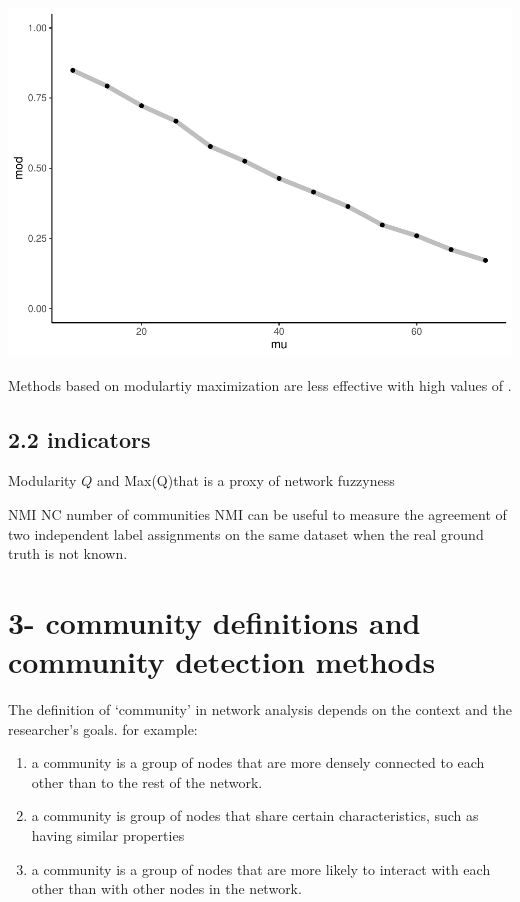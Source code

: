 \documentclass[
]{article}
\begin{document}
\includegraphics{com_det_algorithms_files/figure-latex/unnamed-chunk-2-1.pdf}

Methods based on modulartiy maximization are less effective with high
values of \mu.

\newpage

\hypertarget{indicators}{%
\subsection{2.2 indicators}\label{indicators}}

Modularity \(Q\) and Max(Q)that is a proxy of network fuzzyness

NMI NC number of communities NMI can be useful to measure the agreement
of two independent label assignments on the same dataset when the real
ground truth is not known.

\newpage

\hypertarget{community-definitions-and-community-detection-methods}{%
\section{3- community definitions and community detection
methods}\label{community-definitions-and-community-detection-methods}}

The definition of `community' in network analysis depends on the context
and the researcher's goals. for example:

\begin{enumerate}
\def\labelenumi{\arabic{enumi}.}
\item
  a community is a group of nodes that are more densely connected to
  each other than to the rest of the network.
\item
  a community is group of nodes that share certain characteristics, such
  as having similar properties
\item
  a community is a group of nodes that are more likely to interact with
  each other than with other nodes in the network.
\end{enumerate}
\end{document}
